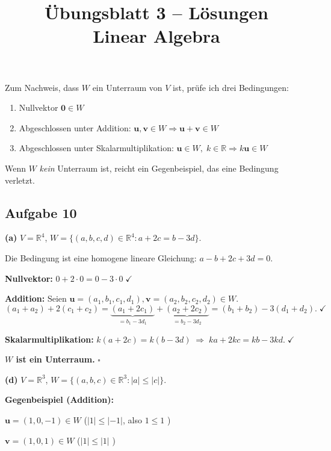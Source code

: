 \documentclass[a4paper,12pt]{article}
\title{\"Ubungsblatt 3 -- L\"osungen \\ \large Linear Algebra}
\author{}
\date{}
\begin{document}
\maketitle

\noindent
Zum Nachweis, dass $W$ ein Unterraum von $V$ ist, pr\"ufe ich drei Bedingungen:
\begin{enumerate}[nosep]
    \item Nullvektor $\mathbf{0} \in W$
    \item Abgeschlossen unter Addition: $\mathbf{u}, \mathbf{v} \in W \Rightarrow \mathbf{u} + \mathbf{v} \in W$
    \item Abgeschlossen unter Skalarmultiplikation: $\mathbf{u} \in W,\; k \in \mathbb{R} \Rightarrow k\mathbf{u} \in W$
\end{enumerate}
Wenn $W$ \emph{kein} Unterraum ist, reicht ein Gegenbeispiel, das eine Bedingung verletzt.

\subsection*{Aufgabe 10}

\textbf{(a)} $V = \mathbb{R}^4$, \;$W = \{(a,b,c,d) \in \mathbb{R}^4 : a + 2c = b - 3d\}$.

Die Bedingung ist eine homogene lineare Gleichung: $a - b + 2c + 3d = 0$.

\textbf{Nullvektor:}
$0 + 2 \cdot 0 = 0 - 3 \cdot 0 \;\checkmark$

\textbf{Addition:}
Seien $\mathbf{u} = (a_1,b_1,c_1,d_1), \mathbf{v} = (a_2,b_2,c_2,d_2) \in W$.
\[
(a_1{+}a_2) + 2(c_1{+}c_2)
= \underbrace{(a_1{+}2c_1)}_{=b_1-3d_1} + \underbrace{(a_2{+}2c_2)}_{=b_2-3d_2}
= (b_1{+}b_2) - 3(d_1{+}d_2). \;\checkmark
\]

\textbf{Skalarmultiplikation:}
$k(a+2c) = k(b-3d) \;\Rightarrow\; ka + 2kc = kb - 3kd. \;\checkmark$

\textbf{$W$ ist ein Unterraum.} $\square$

\bigskip

\textbf{(d)} $V = \mathbb{R}^3$, \;$W = \{(a,b,c) \in \mathbb{R}^3 : |a| \leq |c|\}$.

\textbf{Gegenbeispiel (Addition):}

$\mathbf{u} = (1, 0, -1) \in W$ \;($|1| \leq |-1|$, also $1 \leq 1$ \checkmark)

$\mathbf{v} = (1, 0, 1) \in W$ \;($|1| \leq |1|$ \checkmark)
\end{document}
